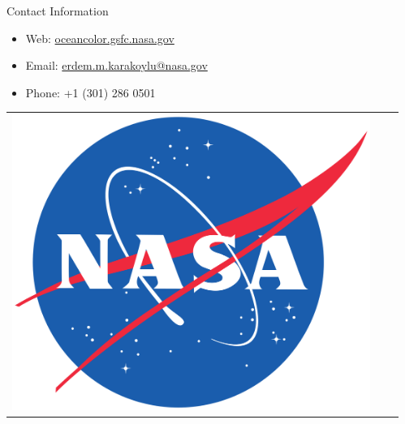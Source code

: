 \documentclass[final]{beamer}
\newlength{\sepwid}
\newlength{\onecolwid}
\begin{document}
\begin{frame}[t]
\begin{columns}[t]
\begin{column}{\onecolwid}

\begin{alertblock}{Contact Information}

\begin{itemize}
\item Web: \href{oceancolor.gsfc.nasa.gov}{oceancolor.gsfc.nasa.gov}
\item Email: \href{mailto:erdem.m.karakoylu@nasa.gov}{erdem.m.karakoylu@nasa.gov}
\item Phone: +1 (301) 286 0501
\end{itemize}

\end{alertblock}

\begin{center}
\begin{tabular}{ccc}
\includegraphics[width=0.4\linewidth]{NASA_logo.png} & \hfill 
\end{tabular}
\end{center}


\end{column} %
\begin{column}{\sepwid}\end{column} %
\end{columns} %

\end{frame} %
\end{document}
